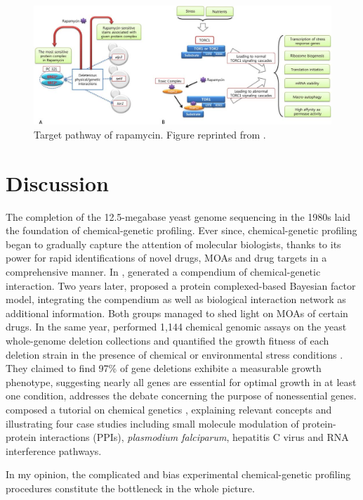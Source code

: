 \documentclass[12pt,conference,compsocconf]{article}
\begin{document}
\begin{figure}
\centering
\includegraphics[width=\linewidth]{1079-5.png}
\caption{Target pathway of rapamycin. Figure reprinted from \citep{1079}.}
\label{fig:1079-5}
\end{figure}

\section{Discussion}

The completion of the 12.5-megabase yeast genome sequencing in the 1980s laid the foundation of chemical-genetic profiling. Ever since, chemical-genetic profiling began to gradually capture the attention of molecular biologists, thanks to its power for rapid identifications of novel drugs, MOAs and drug targets in a comprehensive manner. In \citeyear{1078},  generated a compendium of chemical-genetic interaction. Two years later,  proposed a protein complexed-based Bayesian factor model, integrating the compendium as well as biological interaction network as additional information. Both groups managed to shed light on MOAs of certain drugs. In the same year,  performed 1,144 chemical genomic assays on the yeast whole-genome deletion collections and quantified the growth fitness of each deletion strain in the presence of chemical or environmental stress conditions \citep{1080}. They claimed to find 97\% of gene deletions exhibite a measurable growth phenotype, suggesting nearly all genes are essential for optimal growth in at least one condition, addresses the debate concerning the purpose of nonessential genes.  composed a tutorial on chemical genetics \citep{1103}, explaining relevant concepts and illustrating four case studies including small molecule modulation of protein-protein interactions (PPIs), \textit{plasmodium falciparum}, hepatitis C virus and RNA interference pathways.

In my opinion, the complicated and bias experimental chemical-genetic profiling procedures constitute the bottleneck in the whole picture. 
\end{document}
